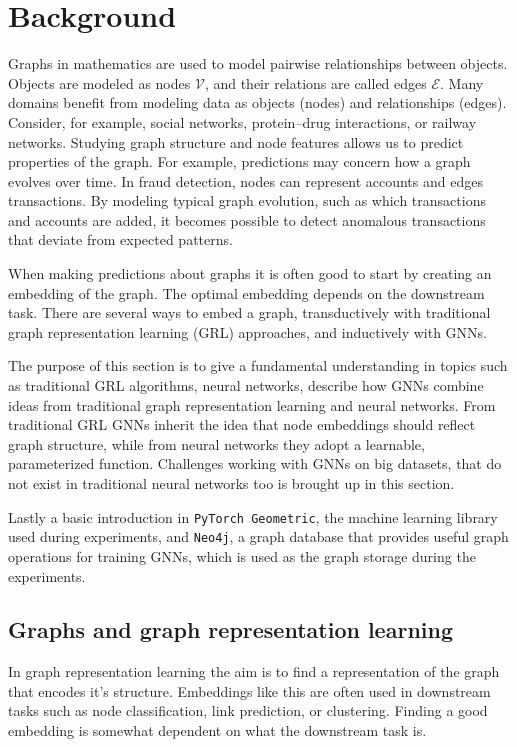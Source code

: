 \documentclass[ oneside,openright,titlepage,numbers=noenddot,headinclude,%
                footinclude=true,cleardoublepage=empty,abstractoff, %
                BCOR=0mm,paper=a4,fontsize=11pt,%
                ngerman,american,%
                ]{scrreprt}
\begin{document}
\chapter{Background}

Graphs in mathematics are used to model pairwise relationships between objects. Objects are modeled as nodes $\mathcal{V}$, and their relations are called edges $\mathcal{E}$. 
Many domains benefit from modeling data as objects (nodes) and relationships (edges). Consider, for example, social networks, protein--drug interactions, or railway networks. 
Studying graph structure and node features allows us to predict properties of the graph. For example, predictions may concern how a graph evolves over time. In fraud detection, nodes can represent accounts and edges transactions. By modeling typical graph evolution, such as which transactions and accounts are added, it becomes possible to detect anomalous transactions that deviate from expected patterns.

When making predictions about graphs it is often good to start by creating an embedding of the graph. The optimal embedding depends on the downstream task. There are several ways to embed a graph, transductively with traditional graph representation learning (GRL) approaches, and inductively with GNNs.

The purpose of this section is to give a fundamental understanding in topics such as traditional GRL algorithms, neural networks, describe how GNNs combine ideas from traditional graph representation learning and neural networks. From traditional GRL GNNs inherit the idea that node embeddings should reflect graph structure, while from neural networks they adopt a learnable, parameterized function. Challenges working with GNNs on big datasets, that do not exist in traditional neural networks too is brought up in this section.

Lastly a basic introduction in \texttt{PyTorch Geometric}, the machine learning library used during experiments, and \texttt{Neo4j}, a graph database that provides useful graph operations for training GNNs, which is used as the graph storage during the experiments.

\section{Graphs and graph representation learning}\label{sec:traditional_grl}
In graph representation learning the aim is to find a representation of the graph that encodes it's structure. Embeddings like this are often used in  downstream tasks such as node classification, link prediction, or clustering. Finding a good embedding is somewhat dependent on what the downstream task is.
\end{document}
